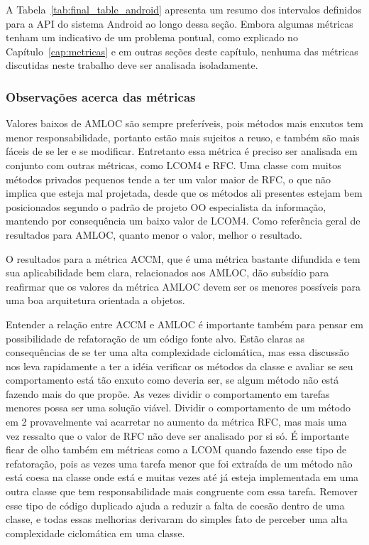 A Tabela~\ref{tab:final_table_android} apresenta um resumo dos intervalos definidos para a API do sistema Android ao longo dessa seção. Embora algumas métricas tenham um indicativo de um problema pontual, como explicado no Capítulo~\ref{cap:metricas} e em outras seções deste capítulo, nenhuma das métricas discutidas neste trabalho deve ser analisada isoladamente.

\subsubsection{Observações acerca das métricas}

Valores baixos de AMLOC são sempre preferíveis, pois métodos mais enxutos tem menor responsabilidade, portanto estão mais sujeitos a reuso, e também são mais fáceis de se ler e se modificar. Entretanto essa métrica é preciso ser analisada em conjunto com outras métricas, como LCOM4 e RFC. Uma classe com muitos métodos privados pequenos tende a ter um valor maior de RFC, o que não implica que esteja mal projetada, desde que os métodos ali presentes estejam bem posicionados segundo o padrão de projeto OO especialista da informação, mantendo por consequência um baixo valor de LCOM4. Como referência geral de resultados para AMLOC, quanto menor o valor, melhor o resultado.

O resultados para a métrica ACCM, que é uma métrica bastante difundida e tem sua aplicabilidade bem clara, relacionados aos AMLOC, dão subsídio para reafirmar que os valores da métrica AMLOC devem ser os menores possíveis para uma boa arquitetura orientada a objetos.

Entender a relação entre ACCM e AMLOC é importante também para pensar em possibilidade de refatoração de um código fonte alvo. Estão claras as consequências de se ter uma alta complexidade ciclomática, mas essa discussão nos leva rapidamente a ter a idéia verificar os métodos da classe e avaliar se seu comportamento está tão enxuto como deveria ser, se algum método não está fazendo mais do que propõe. As vezes dividir o comportamento em tarefas menores possa ser uma solução viável. Dividir o comportamento de um método em 2 provavelmente vai acarretar no aumento da métrica RFC, mas mais uma vez ressalto que o valor de RFC não deve ser analisado por si só. É importante ficar de olho também em métricas como a LCOM quando fazendo esse tipo de refatoração, pois as vezes uma tarefa menor que foi extraída de um método não está coesa na classe onde está e muitas vezes até já esteja implementada em uma outra classe que tem responsabilidade mais congruente com essa tarefa. Remover esse tipo de código duplicado ajuda a reduzir a falta de coesão dentro de uma classe, e todas essas melhorias derivaram do simples fato de perceber uma alta complexidade ciclomática em uma classe.


